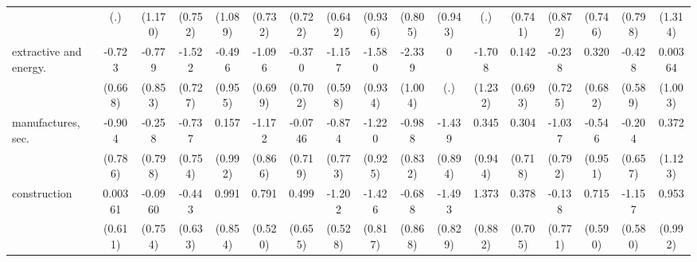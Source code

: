 {\begin{tabular}{l*{16}{c}}
                    &         (.)         &     (1.170)         &     (0.752)         &     (1.089)         &     (0.732)         &     (0.722)         &     (0.642)         &     (0.936)         &     (0.805)         &     (0.943)         &         (.)         &     (0.741)         &     (0.872)         &     (0.746)         &     (0.798)         &     (1.314)         \\
[1em]
extractive and energy.&      -0.723         &      -0.779         &      -1.522\sym{*}  &      -0.496         &      -1.096         &      -0.370         &      -1.157         &      -1.580         &      -2.339\sym{*}  &           0         &      -1.708         &       0.142         &      -0.238         &       0.320         &      -0.428         &     0.00364         \\
                    &     (0.668)         &     (0.853)         &     (0.727)         &     (0.955)         &     (0.699)         &     (0.702)         &     (0.598)         &     (0.934)         &     (1.004)         &         (.)         &     (1.232)         &     (0.693)         &     (0.725)         &     (0.682)         &     (0.589)         &     (1.003)         \\
[1em]
manufactures, sec.  &      -0.904         &      -0.258         &      -0.737         &       0.157         &      -1.172         &     -0.0746         &      -0.874         &      -1.220         &      -0.988         &      -1.439         &       0.345         &       0.304         &      -1.037         &      -0.546         &      -0.204         &       0.372         \\
                    &     (0.786)         &     (0.798)         &     (0.754)         &     (0.992)         &     (0.866)         &     (0.719)         &     (0.773)         &     (0.925)         &     (0.832)         &     (0.894)         &     (0.944)         &     (0.718)         &     (0.792)         &     (0.951)         &     (0.657)         &     (1.123)         \\
[1em]
construction        &     0.00361         &     -0.0960         &      -0.443         &       0.991         &       0.791         &       0.499         &      -1.202\sym{*}  &      -1.426         &      -0.688         &      -1.493         &       1.373         &       0.378         &      -0.138         &       0.715         &      -1.157\sym{*}  &       0.953         \\
                    &     (0.611)         &     (0.754)         &     (0.633)         &     (0.854)         &     (0.520)         &     (0.655)         &     (0.528)         &     (0.817)         &     (0.868)         &     (0.829)         &     (0.882)         &     (0.705)         &     (0.771)         &     (0.590)         &     (0.580)         &     (0.992)         \\

\end{tabular}}
